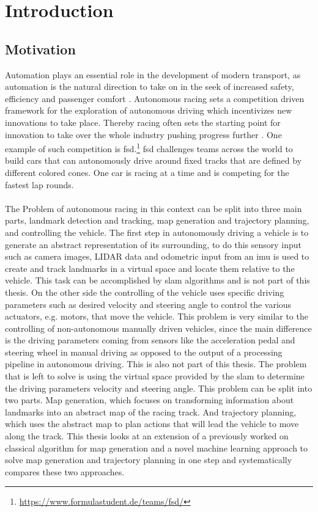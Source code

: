 \graphicspath{{Chapter/Figs/introduction/}}
\chapter{Introduction}

\section{Motivation}
Automation plays an essential role in the development of modern transport, as automation is the natural direction to take on in the seek of increased safety, efficiency and passenger comfort \cite{Lutin2018}. Autonomous racing sets a competition driven framework for the exploration of autonomous driving which incentivizes new innovations to take place. Thereby racing often sets the starting point for innovation to take over the whole industry pushing progress further \cite{Foxall91}. One example of such competition is \ac{fsd}.\footnote{\url{https://www.formulastudent.de/teams/fsd/}} \ac{fsd} challenges teams across the world to build cars that can autonomously drive around fixed tracks that are defined by different colored cones. One car is racing at a time and is competing for the fastest lap rounds.\\
\\The Problem of autonomous racing in this context can be split into three main parts, landmark detection and tracking, map generation and trajectory planning, and controlling the vehicle. The first step in autonomously driving a vehicle is to generate an abstract representation of its surrounding, to do this sensory input such as camera images, LIDAR data and odometric input from an \ac{imu} is used to create and track landmarks in a virtual space and locate them relative to the vehicle. This task can be accomplished by \ac{slam} algorithms \cite{Singandhupe2019} and is not part of this thesis. On the other side the controlling of the vehicle uses specific driving parameters such as desired velocity and steering angle to control the various actuators, e.g. motors, that move the vehicle. This problem is very similar to the controlling of non-autonomous manually driven vehicles, since the main difference is the driving parameters coming from sensors like the acceleration pedal and steering wheel in manual driving as opposed to the output of a processing pipeline in autonomous driving. This is also not part of this thesis. The problem that is left to solve is using the virtual space provided by the \ac{slam} to determine the driving parameters velocity and steering angle. This problem can be split into two parts. Map generation, which focuses on transforming information about landmarks into an abstract map of the racing track. And trajectory planning, which uses the abstract map to plan actions that will lead the vehicle to move along the track. This thesis looks at an extension of a previously worked on classical algorithm for map generation and a novel machine learning approach to solve map generation and trajectory planning in one step and systematically compares these two approaches.\\
